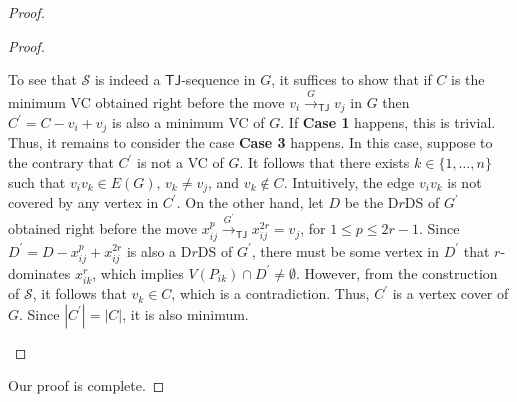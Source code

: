 \documentclass[a4paper]{article}
\theoremstyle{plain}
\theoremstyle{definition}
\newcommand{\sfTJ}{{\mathsf{TJ}}} %
\newcommand{\sfR}{{\mathsf{R}}} %
\newcommand{\calS}{{\mathcal{S}}}
\newcommand{\reconf}[2][\sfR]{\overset{#2}{\longrightarrow}_{#1}} %
\begin{document}
\begin{proof}
\begin{proof}
\begin{itemize}
			To see that $\calS$ is indeed a $\sfTJ$-sequence in $G$, it suffices to show that if $C$ is the minimum VC obtained right before the move $v_i \reconf[\sfTJ]{G} v_j$ in $G$ then $C^\prime = C - v_i + v_j$ is also a minimum VC of $G$.
			If {\bf Case 1} happens, this is trivial.
			Thus, it remains to consider the case {\bf Case 3} happens.
			In this case, suppose to the contrary that $C^\prime$ is not a VC of $G$.
			It follows that there exists $k \in \{1, \dots, n\}$ such that $v_iv_k \in E(G)$, $v_k \neq v_j$, and $v_k \notin C$.
			Intuitively, the edge $v_iv_k$ is not covered by any vertex in $C^\prime$.
			On the other hand, let $D$ be the D$r$DS of $G^\prime$ obtained right before the move $x_{ij}^{p} \reconf[\sfTJ]{G^\prime} x_{ij}^{2r} = v_j$, for $1 \leq p \leq 2r-1$.
			Since $D^\prime = D - x_{ij}^{p} + x_{ij}^{2r}$ is also a D$r$DS of $G^\prime$, there must be some vertex in $D^\prime$ that $r$-dominates $x_{ik}^r$, which implies $V(P_{ik}) \cap D^\prime \neq \emptyset$.
			However, from the construction of $\calS$, it follows that $v_k \in C$, which is a contradiction.
			Thus, $C^\prime$ is a vertex cover of $G$.
			Since $|C^\prime| = |C|$, it is also minimum.
		\end{itemize}
	\end{proof}
	Our proof is complete.
\end{proof}
\end{document}
